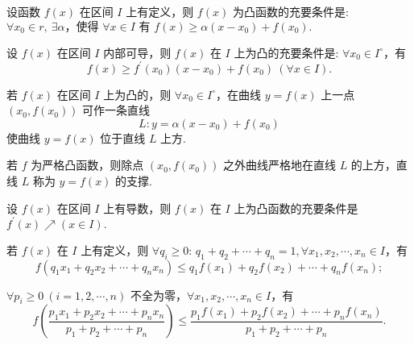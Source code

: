 \begin{theorem}
    设函数 $ f(x) $ 在区间 $ I $ 上有定义，则 $ f(x) $ 为凸函数的充要条件是: $ \forall x_{0} \in   r,~
        \exists  \alpha \text{，使得 } \forall x \in I  \text{ 有 }  f(x) \geqslant \alpha\left(x-x_{0}\right)+f\left(x_{0}\right) .$
\end{theorem}

\begin{inference}
    设 $ f(x) $ 在区间 $ I $ 内部可导，则 $ f(x) $ 在 $ I $ 上为凸的充要条件是: $ \forall x_{0} \in I^{\circ}$，有
    $$f(x) \geqslant f^{\prime}\left(x_{0}\right)\left(x-x_{0}\right)+f\left(x_{0}\right)~ (\forall x \in I) .$$
\end{inference}

\begin{inference}
    若 $ f(x) $ 在区间 $ I $ 上为凸的，则 $ \forall x_{0} \in I^{\circ}$，在曲线 $ y=f(x) $ 上一点 $ \left(x_{0}\right. ,  \left.f\left(x_{0}\right)\right)$ 可作一条直线
    $$L: y=\alpha\left(x-x_{0}\right)+f\left(x_{0}\right)$$
    使曲线 $ y=f(x) $ 位于直线 $ L $ 上方.
\end{inference}

\begin{theorem}[分离性定理]
    若 $ f $ 为严格凸函数，则除点 $ \left(x_{0}, f\left(x_{0}\right)\right) $ 之外曲线严格地在直线 $ L $ 的上方，直线 $ L $ 称为 $ y=f(x) $ 的支撑.
\end{theorem}

\begin{theorem}
    设 $ f(x) $ 在区间 $ I $ 上有导数，则 $ f(x) $ 在 $ I $ 上为凸函数的充要条件是 $ f^{\prime}(x) \nearrow(x \in I) .$
\end{theorem}

\begin{theorem}
    若 $f(x)$ 在 $I$ 上有定义，则
    $\forall q_{i} \geqslant 0$: $q_{1}+q_{2}+\cdots+q_{n}=1, \forall x_{1}, x_{2}, \cdots, x_{n} \in I$，有
    $$f\left(q_{1} x_{1}+q_{2} x_{2}+\cdots+q_{n} x_{n}\right) \leqslant q_{1} f\left(x_{1}\right)+q_{2} f\left(x_{2}\right)+\cdots+q_{n} f\left(x_{n}\right);$$

    $\forall p_{i} \geqslant 0~ (i=1,2, \cdots, n)$ 不全为零，$\forall x_{1}, x_{2}, \cdots, x_{n} \in I$，有
    $$f\left(\frac{p_{1} x_{1}+p_{2} x_{2}+\cdots+p_{n} x_{n}}{p_{1}+p_{2}+\cdots+p_{n}}\right) \leqslant \frac{p_{1} f\left(x_{1}\right)+p_{2} f\left(x_{2}\right)+\cdots+p_{n} f\left(x_{n}\right)}{p_{1}+p_{2}+\cdots+p_{n}} .$$
\end{theorem}

